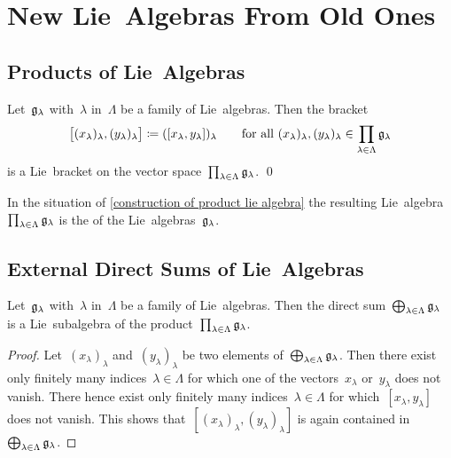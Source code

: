 \section{New Lie~Algebras From Old Ones}


\subsection{Products of Lie~Algebras}


\begin{proposition}
	\label{construction of product lie algebra}
	Let~$\mathfrak{g}_{\lambda}$ with~$\lambda$ in~$\Lambda$ be a family of Lie~algebras.
	Then the bracket
	\[
		\bigl[ (x_\lambda)_\lambda, (y_\lambda)_\lambda \bigr]
		\coloneqq
		( [x_\lambda, y_\lambda] )_\lambda
		\qquad
		\text{for all~$(x_\lambda)_\lambda, (y_\lambda)_\lambda \in \prod_{\lambda \in \Lambda} \mathfrak{g}_\lambda$}
	\]
	is a Lie~bracket on the vector space~$\prod_{\lambda \in \Lambda} \mathfrak{g}_\lambda$.
	\qed
\end{proposition}


\begin{definition}
	In the situation of \cref{construction of product lie algebra} the resulting Lie~algebra~$\prod_{\lambda \in \Lambda} \mathfrak{g}_\lambda$ is the  of the Lie~algebras~$\mathfrak{g}_\lambda$.
\end{definition}


\subsection{External Direct Sums of Lie~Algebras}


\begin{proposition}
	\label{construction of direct sum of lie algebras}
	Let~$\mathfrak{g}_\lambda$ with~$\lambda$ in~$\Lambda$ be a family of Lie~algebras.
	Then the direct sum~$\bigoplus_{\lambda \in \Lambda} \mathfrak{g}_\lambda$ is a Lie~subalgebra of the product~$\prod_{\lambda \in \Lambda} \mathfrak{g}_\lambda$.
\end{proposition}


\begin{proof}
	Let~$(x_\lambda)_\lambda$ and~$(y_\lambda)_\lambda$ be two elements of~$\bigoplus_{\lambda \in \Lambda} \mathfrak{g}_\lambda$.
	Then there exist only finitely many indices~$\lambda \in \Lambda$ for which one of the vectors~$x_\lambda$ or~$y_\lambda$ does not vanish.
	There hence exist only finitely many indices~$\lambda \in \Lambda$ for which~$[x_\lambda, y_\lambda]$ does not vanish.
	This shows that~$[ (x_\lambda)_\lambda, (y_\lambda)_\lambda ]$ is again contained in~$\bigoplus_{\lambda \in \Lambda} \mathfrak{g}_\lambda$.
\end{proof}


